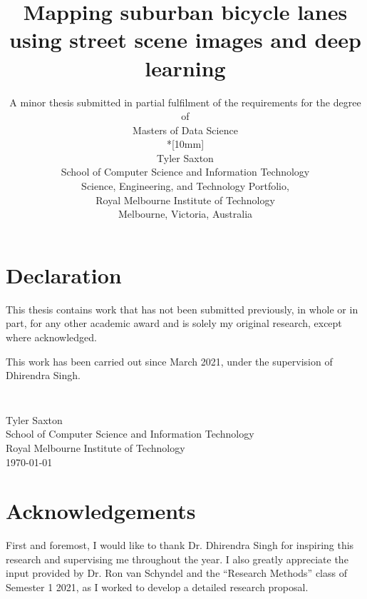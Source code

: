 \documentclass[11pt,twoside]{report}
\newcommand{\SubmissionDate}{\today}
\newcommand{\student}{Tyler Saxton}
\newcommand{\supervisor}{Dhirendra Singh}
\newcommand{\topic}{Mapping suburban bicycle lanes using street scene images and deep learning}
\newcommand{\school}{School of Computer Science and Information Technology}
\newcommand{\program}{Masters of Data Science}
\newcommand{\institution}{Royal Melbourne Institute of Technology}
\begin{document}
\title{{\Large\bf \topic}}
\author{
A minor thesis submitted in partial fulfilment of the requirements for the degree of
\\\program\\*[10mm]
\\\student
\\\school
\\Science, Engineering, and Technology Portfolio,
\\\institution
\\Melbourne, Victoria, Australia
}
\maketitle
\thispagestyle{empty}


\chapter*{Declaration}

This thesis contains work that has not been submitted previously, in
whole or in part, for any other academic award and is solely my
original research, except where acknowledged.

This work has been carried out since March 2021, under the
supervision of {\supervisor}.

\paragraph{}
\vspace{5cm}\noindent \\\student \\
\school\\
\institution\\
\SubmissionDate


\chapter*{Acknowledgements}

First and foremost, I would like to thank Dr. Dhirendra Singh for inspiring this research and supervising me throughout the year.  I also greatly appreciate the input provided by Dr. Ron van Schyndel and the ``Research Methods'' class of Semester 1 2021, as I worked to develop a detailed research proposal. \\
\end{document}
